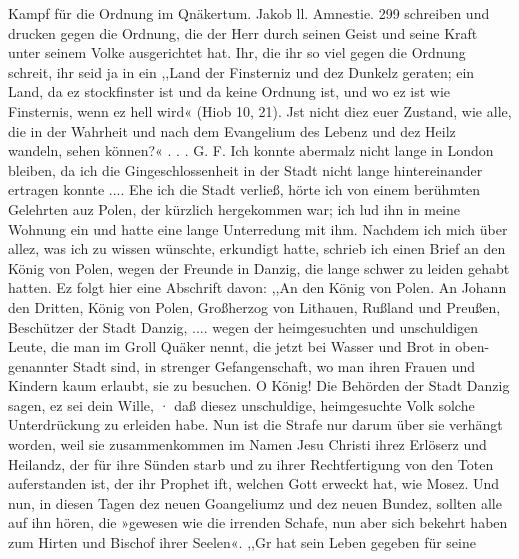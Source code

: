 Kampf für die Ordnung im Qnäkertum. Jakob ll. Amnestie. 299
schreiben und drucken gegen die Ordnung, die der Herr durch
seinen Geist und seine Kraft unter seinem Volke ausgerichtet hat.
Ihr, die ihr so viel gegen die Ordnung schreit, ihr seid ja
in ein ,,Land der Finsterniz und dez Dunkelz geraten; ein Land,
da ez stockfinster ist und da keine Ordnung ist, und wo ez ist
wie Finsternis, wenn ez hell wird« (Hiob 10, 21). Jst nicht
diez euer Zustand, wie alle, die in der Wahrheit und nach dem
Evangelium des Lebenz und dez Heilz wandeln, sehen können?« . . .
G. F.
Ich konnte abermalz nicht lange in London bleiben, da ich
die Gingeschlossenheit in der Stadt nicht lange hintereinander
ertragen konnte .... Ehe ich die Stadt verließ, hörte ich von
einem berühmten Gelehrten auz Polen, der kürzlich hergekommen
war; ich lud ihn in meine Wohnung ein und hatte eine lange
Unterredung mit ihm. Nachdem ich mich über allez, was ich zu
wissen wünschte, erkundigt hatte, schrieb ich einen Brief an den
König von Polen, wegen der Freunde in Danzig, die lange
schwer zu leiden gehabt hatten. Ez folgt hier eine Abschrift
davon:
,,An den König von Polen.
An Johann den Dritten, König von Polen, Großherzog von
Lithauen, Rußland und Preußen, Beschützer der Stadt Danzig, ....
wegen der heimgesuchten und unschuldigen Leute, die man im
Groll Quäker nennt, die jetzt bei Wasser und Brot in oben-
genannter Stadt sind, in strenger Gefangenschaft, wo man ihren
Frauen und Kindern kaum erlaubt, sie zu besuchen.
O König!
Die Behörden der Stadt Danzig sagen, ez sei dein Wille,
· daß diesez unschuldige, heimgesuchte Volk solche Unterdrückung zu
erleiden habe. Nun ist die Strafe nur darum über sie verhängt
worden, weil sie zusammenkommen im Namen Jesu Christi ihrez
Erlöserz und Heilandz, der für ihre Sünden starb und zu ihrer
Rechtfertigung von den Toten auferstanden ist, der ihr Prophet
ift, welchen Gott erweckt hat, wie Mosez.
Und nun, in diesen Tagen dez neuen Goangeliumz und dez
neuen Bundez, sollten alle auf ihn hören, die »gewesen wie die
irrenden Schafe, nun aber sich bekehrt haben zum Hirten und
Bischof ihrer Seelen«. ,,Gr hat sein Leben gegeben für seine


